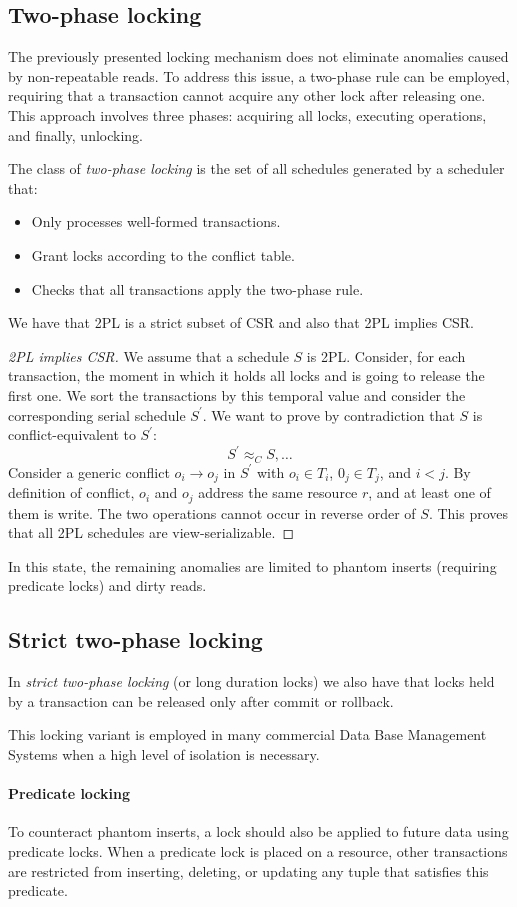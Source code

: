 \subsection{Two-phase locking}
The previously presented locking mechanism does not eliminate anomalies caused by non-repeatable reads. 
To address this issue, a two-phase rule can be employed, requiring that a transaction cannot acquire any other lock after releasing one. 
This approach involves three phases: acquiring all locks, executing operations, and finally, unlocking.
\begin{definition}
    The class of \emph{two-phase locking} is the set of all schedules generated by a scheduler that: 
    \begin{itemize}
        \item Only processes well-formed transactions. 
        \item Grant locks according to the conflict table. 
        \item Checks that all transactions apply the two-phase rule.             
    \end{itemize}
\end{definition}
We have that 2PL is a strict subset of CSR and also that 2PL implies CSR. 
\begin{proof}[2PL implies CSR]
    We assume that a schedule $S$ is 2PL. Consider, for each transaction, the moment in which it holds all locks and is going to release the first one. 
    We sort the transactions by this temporal value and consider the corresponding serial schedule $S^{'}$. 
    We want to prove by contradiction that $S$ is conflict-equivalent to $S^{'}$: 
    \[S^{'}\approx_CS,\dots\]
    Consider a generic conflict $o_i \rightarrow o_j$ in $S^{'}$ with $o_i \in T_i$, $0_j \in T_j$, and $i<j$. 
    By definition of conflict, $o_i$ and $o_j$ address the same resource $r$, and at least one of them is write. 
    The two operations cannot occur in reverse order of $S$. 
    This proves that all 2PL schedules are view-serializable. 
\end{proof}
In this state, the remaining anomalies are limited to phantom inserts (requiring predicate locks) and dirty reads.

\subsection{Strict two-phase locking}
\begin{definition}
    In \emph{strict two-phase locking} (or long duration locks) we also have that locks held by a transaction can be released only after commit or rollback.
\end{definition}
This locking variant is employed in many commercial Data Base Management Systems when a high level of isolation is necessary.

\paragraph*{Predicate locking}
To counteract phantom inserts, a lock should also be applied to future data using predicate locks. 
When a predicate lock is placed on a resource, other transactions are restricted from inserting, deleting, or updating any tuple that satisfies this predicate.